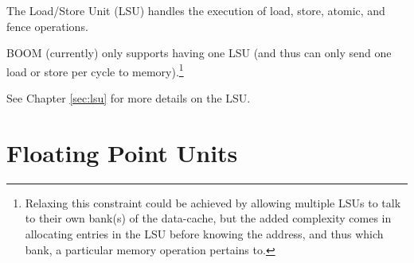 The Load/Store Unit (LSU) handles the execution of load, store, atomic, and fence operations. 

BOOM (currently) only supports having one LSU (and thus can only send one load or store per cycle to memory).\footnote{Relaxing this constraint could be achieved by allowing multiple LSUs to talk to their own bank(s) of the data-cache, but the added complexity comes in allocating entries in the LSU before knowing the address, and thus which bank, a particular memory operation pertains to.}

See Chapter \ref{sec:lsu} for more details on the LSU.

\section{Floating Point Units}

